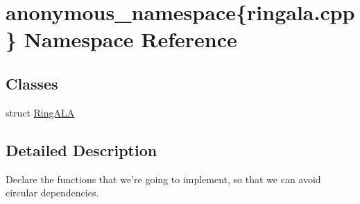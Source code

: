 \hypertarget{namespaceanonymous__namespace_02ringala_8cpp_03}{\section{anonymous\-\_\-namespace\{ringala.\-cpp\} Namespace Reference}
\label{namespaceanonymous__namespace_02ringala_8cpp_03}
}
\subsection*{Classes}
\begin{DoxyCompactItemize}
\item 
struct \hyperlink{structanonymous__namespace_02ringala_8cpp_03_1_1RingALA}{Ring\-A\-L\-A}
\end{DoxyCompactItemize}


\subsection{Detailed Description}
Declare the functions that we're going to implement, so that we can avoid circular dependencies. 